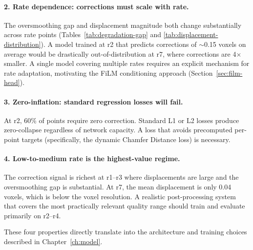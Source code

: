 \paragraph{2. Rate dependence: corrections must scale with rate.}
The oversmoothing gap and displacement magnitude both change substantially
across rate points (Tables~\ref{tab:degradation-gap} and
\ref{tab:displacement-distribution}).
A model trained at r2 that predicts corrections of $\sim$0.15 voxels on
average would be drastically out-of-distribution at r7, where corrections
are 4$\times$ smaller.
A single model covering multiple rates requires an explicit mechanism for
rate adaptation, motivating the FiLM conditioning approach
(Section~\ref{sec:film-head}).

\paragraph{3. Zero-inflation: standard regression losses will fail.}
At r2, 60\% of points require zero correction.
Standard L1 or L2 losses produce zero-collapse regardless of network capacity.
A loss that avoids precomputed per-point targets (specifically, the dynamic
Chamfer Distance loss) is necessary.

\paragraph{4. Low-to-medium rate is the highest-value regime.}
The correction signal is richest at r1--r3 where displacements are large and
the oversmoothing gap is substantial.
At r7, the mean displacement is only 0.04 voxels, which is below the voxel
resolution.
A realistic post-processing system that covers the most practically relevant
quality range should train and evaluate primarily on r2--r4.

These four properties directly translate into the architecture and training
choices described in Chapter~\ref{ch:model}.
